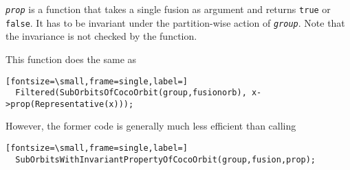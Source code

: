 \documentclass[a4paper,11pt]{report}
\begin{document}
{{{ \mbox{\texttt{\mdseries\slshape prop}} is a function that takes a single fusion as argument and returns \texttt{true} or \texttt{false}. It has to be invariant under the partition-wise action of \mbox{\texttt{\mdseries\slshape group}}. Note that the invariance is not checked by the function. 

 This function does the same as 
\begin{Verbatim}[fontsize=\small,frame=single,label=]
  Filtered(SubOrbitsOfCocoOrbit(group,fusionorb), x->prop(Representative(x)));
\end{Verbatim}
 However, the former code is generally much less efficient than calling 
\begin{Verbatim}[fontsize=\small,frame=single,label=]
  SubOrbitsWithInvariantPropertyOfCocoOrbit(group,fusion,prop);
\end{Verbatim}
 }

 }

 }

 
\end{document}
